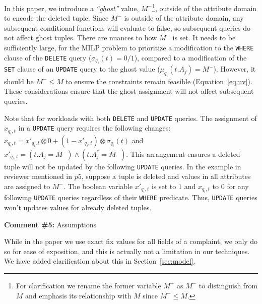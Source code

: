 
In this paper, we introduce a \emph{``ghost''} value, 
$M^-$\footnote{For clarification we rename the former variable $M^+$ as $M^-$ to distinguish
from $M$ and emphasis its relationship with $M$ since $M^- \leq M$.}, outside of the attribute domain
to encode the deleted tuple.
Since $M^-$ is outside of the attribute domain, any subsequent conditional functions will
evaluate to false, so subsequent queries do not affect ghost tuples. There are
nuances to how $M^-$ is set. It needs to be sufficiently large, for the MILP
problem to prioritize a modification to the \texttt{WHERE} clause of the
\texttt{DELETE} query ($\sigma_{q_i}(t) = 0/1$), compared to a modification of
the \texttt{SET} clause of an \texttt{UPDATE} query to the ghost value
($\mu_{q_i}(t.A_j) = M^-$). However, it should be $M^- \leq M $ to ensure the
constraints remain feasible (Equation~\ref{eq:uv}). These considerations
ensure that the ghost assignment will not affect subsequent queries.

Note that for workloads with both \texttt{DELETE} and \texttt{UPDATE} queries.
The assignment of $x_{q_i, t}$ in a \texttt{UPDATE} query 
requires the following changes:
$x_{q_i, t} = x'_{q_i, t} \otimes 0 + (1-x'_{q_i, t}) \otimes \sigma_{q_i}(t)$ and
$x'_{q_i, t}= (t.A_j = M^-) \wedge (t.A_j^* = M^-)$.
This arrangement ensures a deleted tuple will not be updated by the following \texttt{UPDATE} queries. 
In the example in reviewer mentioned in $p5$, suppose a tuple is deleted and values in all attributes are assigned to $M^-$. 
The boolean variable $x'_{q_i, t}$ is set to $1$ and $x_{q_i, t} $ to $0$ for any following \texttt{UPDATE} queries regardless
of their \texttt{WHERE} predicate. Thus, \texttt{UPDATE} queries won't updates values for already deleted tuples. 

\comskip

\noindent
\textbf{Comment \#5:} Assumptions
\begin{quote}
\end{quote}

While in the paper we use exact fix values for all fields of a complaint, we
only do so for ease of exposition, and this is actually not a limitation in
our techniques. We have added clarification about this in
Section~\ref{sec:model}.



